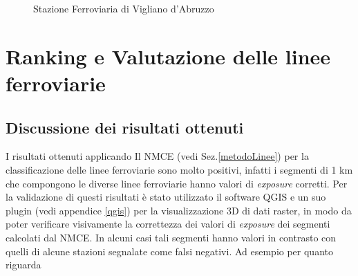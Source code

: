 \begin{itemize}
\begin{figure}[bth]
\myfloatalign
{} \quad
{} 
\caption[]{Stazione Ferroviaria di Vigliano d'Abruzzo}\label{fig:vigliano}
\end{figure}
\end{itemize}

\section{Ranking e Valutazione delle linee ferroviarie}
\subsection{Discussione dei risultati ottenuti}
I risultati ottenuti applicando Il NMCE (vedi Sez.\ref{metodoLinee}) per la classificazione delle linee ferroviarie sono molto positivi, infatti i segmenti di 1 km che compongono le diverse linee ferroviarie hanno valori di \textit{exposure} corretti. Per la validazione di questi risultati è stato utilizzato il software QGIS e un suo plugin (vedi appendice \ref{qgis}) per la visualizzazione 3D di dati raster, in modo da poter verificare visivamente la correttezza dei valori di \textit{exposure} dei segmenti calcolati dal NMCE. \newline
 In alcuni casi tali segmenti hanno valori in contrasto con quelli di alcune stazioni segnalate come falsi negativi. \newline
Ad esempio per quanto riguarda 